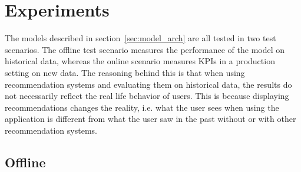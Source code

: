 \chapter{Experiments}
The models described in section~\ref{sec:model_arch} are all tested in two test scenarios.
The offline test scenario measures the performance of the model on historical data, whereas the online scenario measures KPIs in a production setting on new data.
The reasoning behind this is that when using recommendation systems and evaluating them on historical data, the results do not necessarily reflect the real life behavior of users.
This is because displaying recommendations changes the reality, i.e. what the user sees when using the application is different from what the user saw in the past without or with other recommendation systems.
\section{Offline}
